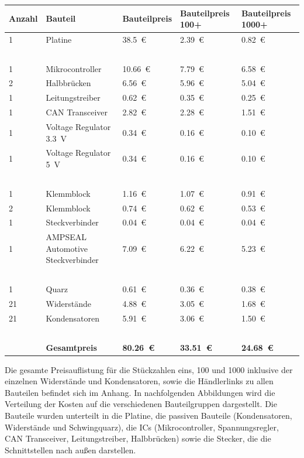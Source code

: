 \begin{table}[h]
	\centering
\begin{tabular}{ l   l   l   l   l }
	Anzahl & Bauteil & Bauteilpreis & Bauteilpreis 100+ & Bauteilpreis 1000+\\ \hline
	1 & Platine & \SI{38,5}{\euro} & \SI{2,39}{\euro} & \SI{0,82}{\euro}\\
	\  & \  & \  & \  & \  \\
	1 & Mikrocontroller & \SI{10,66}{\euro} & \SI{7,79}{\euro} & \SI{6,58}{\euro} \\
	2 & Halbbrücken & \SI{6,56}{\euro} & \SI{5,96}{\euro} & \SI{5,04}{\euro}\\
	1 & Leitungstreiber & \SI{0,62}{\euro} & \SI{0,35}{\euro} & \SI{0,25}{\euro} \\
	1 & CAN Transceiver & \SI{2,82}{\euro} & \SI{2,28}{\euro} & \SI{1,51}{\euro} \\
	1 & Voltage Regulator \SI{3,3}{V} & \SI{0,34}{\euro} & \SI{0,16}{\euro} & \SI{0,10}{\euro} \\
	1 & Voltage Regulator \SI{5}{V}& \SI{0,34}{\euro} & \SI{0,16}{\euro} & \SI{0,10}{\euro} \\
	\  & \  & \  & \  & \  \\
	1 & Klemmblock & \SI{1,16}{\euro} & \SI{1,07}{\euro} & \SI{0,91}{\euro} \\
	2 & Klemmblock & \SI{0,74}{\euro} & \SI{0,62}{\euro} & \SI{0,53}{\euro} \\
	1 & Steckverbinder & \SI{0,04}{\euro} & \SI{0,04}{\euro} & \SI{0,04}{\euro} \\
	1 & AMPSEAL Automotive Steckverbinder & \SI{7,09}{\euro} & \SI{6,22}{\euro} & \SI{5,23}{\euro}\\
	\  & \  & \  & \  & \  \\
	1 & Quarz & \SI{0,61}{\euro} & \SI{0,36}{\euro} & \SI{0,38}{\euro} \\
	21 & Widerstände & \SI{4,88}{\euro} & \SI{3,05}{\euro} & \SI{1,68}{\euro}\\
	21 & Kondensatoren & \SI{5,91}{\euro} & \SI{3,06}{\euro} & \SI{1,50}{\euro}\\
	\  & \  & \  & \  & \  \\
	\  & \textbf{Gesamtpreis} & \textbf{\SI{80,26}{\euro}}  & \textbf{\SI{33,51}{\euro}}  & \textbf{\SI{24,68}{\euro}}  \\
\end{tabular}
	\label{tab:Preisliste}
\end{table}\noindent
Die gesamte Preisauflistung für die Stückzahlen eins, 100 und 1000 inklusive der einzelnen Widerstände und Kondensatoren, sowie die Händlerlinks zu allen Bauteilen befindet sich im Anhang.
In nachfolgenden Abbildungen wird die Verteilung der Kosten auf die verschiedenen Bauteilgruppen dargestellt. Die Bauteile wurden unterteilt in die Platine, die passiven Bauteile (Kondensatoren, Widerstände und Schwingquarz), die ICs (Mikrocontroller, Spannungsregler, CAN Transceiver, Leitungstreiber, Halbbrücken) sowie die Stecker, die die Schnittstellen nach außen darstellen. 

